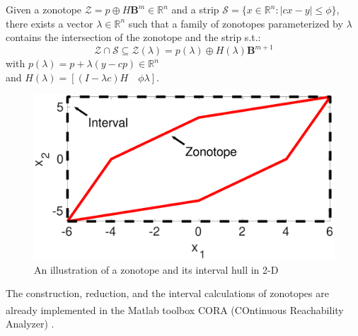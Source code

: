\begin{lemma}\label{prop:intersect} \cite{Alamo2005}
Given a zonotope $\mathcal{Z} = p \oplus H\textbf{B}^m \in \mathbb{R}^n$ and a strip $\mathscr{S} = \{x \in \mathbb{R}^n : |cx-y| \leq \phi\}$, there exists a vector $\lambda \in \mathbb{R}^n$ such that a family of zonotopes parameterized by $\lambda$ contains the intersection of the zonotope and the strip s.t.:
\begin{equation}
\mathcal{Z} \cap \mathscr{S} \subseteq \mathcal{Z}(\lambda) =  p(\lambda) \oplus H(\lambda) \textbf{B}^{m+1}
\end{equation} 
with $p(\lambda) = p + \lambda(y - cp) \in \mathbb{R}^n$ \\
and $H(\lambda) = [(I - \lambda c)H \quad \phi \lambda]$.

\end{lemma}
\begin{figure}[!h]
\label{fig:zonotope}
\centering
\includegraphics[width=.8\linewidth]{figures/zonotope}
\caption{An illustration of a zonotope and its interval hull in 2-D}
\end{figure}
The construction, reduction, and the interval calculations of zonotopes are already implemented in the Matlab\textsuperscript{\tiny\textregistered} toolbox CORA (COntinuous Reachability Analyzer) \cite{Althoff2018}.
